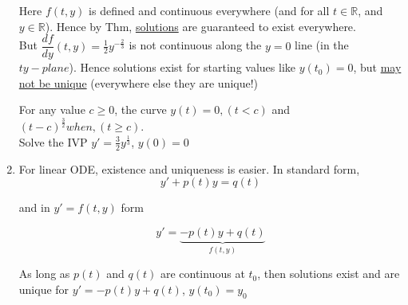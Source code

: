 \begin{enumerate}[label=\protect\circled{\alph*}]
\begin{example-N}
		Here $f(t,y)$ is defined and continuous everywhere (and for all $t\in \mathbb{R}$, and $y \in \mathbb{R}$). Hence by Thm, \underline{solutions} are guaranteed to exist everywhere.\\
		But $\dfrac{df}{dy}(t,y) = \frac{1}{2}y^{-\frac{2}{3}}$ is not continuous along the $y=0$ line (in the $ty-plane$). Hence solutions exist for starting values like $y(t_0) = 0$, but \underline{may not be unique} (everywhere else they are unique!)
	\end{example-N}
	For any value $c \geq 0$, the curve $y(t) = 0, (t < c)$ and $(t-c)^{\frac{3}{2}} when, (t \geq c)$.\\
	Solve the IVP $y' = \frac{3}{2}y^{\frac{1}{3}}$, $y(0) = 0$
	\begin{center}
	\end{center}
	\item For linear ODE, existence and uniqueness is easier. In standard form,
	\begin{equation*}
		y' + p(t)y = q(t)
	\end{equation*}
	\begin{center}
		and in $y' = f(t,y)$ form
	\end{center}
	\begin{equation*}
		y' = \underbrace{-p(t)y + q(t)}_{f(t,y)}
	\end{equation*}
	\begin{theorem-N}
		As long as $p(t)$ and $q(t)$ are continuous at $t_0$, then solutions exist and are unique for $y' = -p(t)y + q(t)$, $y(t_0) = y_0$
	\end{theorem-N}
\end{enumerate}